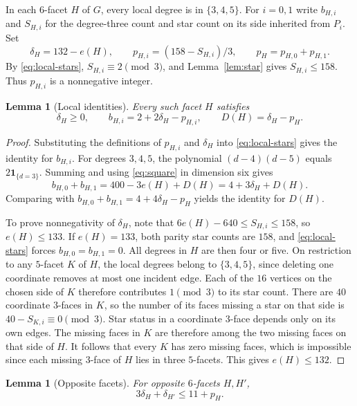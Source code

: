\documentclass[11pt,reqno]{amsart}
\numberwithin{equation}{section}
\newtheorem{lemma}[theorem]{Lemma}
\newcommand{\one}{\mathbf{1}}
\begin{document}
In each \(6\)-facet \(H\) of \(G\), every local degree is in
\(\{3,4,5\}\). For \(i=0,1\) write \(b_{H,i}\) and \(S_{H,i}\)
for the degree-three count and star count on its side inherited from
\(P_i\). Set
\[
  \delta_H=132-e(H),\qquad p_{H,i}=(158-S_{H,i})/3,\qquad
  p_H=p_{H,0}+p_{H,1}.
\]
By \eqref{eq:local-stars}, \(S_{H,i}\equiv2\pmod3\), and
Lemma~\ref{lem:star} gives \(S_{H,i}\le158\). Thus \(p_{H,i}\)
is a nonnegative integer.

\begin{lemma}[Local identities]\label{lem:local-identities}
Every such facet \(H\) satisfies
\begin{equation}\label{eq:local-identities}
  \delta_H\ge0,\qquad
  b_{H,i}=2+2\delta_H-p_{H,i},\qquad D(H)=\delta_H-p_H .
\end{equation}
\end{lemma}

\begin{proof}
Substituting the definitions of \(p_{H,i}\) and \(\delta_H\) into
\eqref{eq:local-stars} gives the identity for \(b_{H,i}\).
For degrees \(3,4,5\), the polynomial \((d-4)(d-5)\) equals
\(2\one_{\{d=3\}}\). Summing and using \eqref{eq:square} in
dimension six gives
\[
  b_{H,0}+b_{H,1}=400-3e(H)+D(H)=4+3\delta_H+D(H).
\]
Comparing with \(b_{H,0}+b_{H,1}=4+4\delta_H-p_H\) yields the
identity for \(D(H)\).

To prove nonnegativity of \(\delta_H\), note that
\(6e(H)-640\le S_{H,i}\le158\), so \(e(H)\le133\).
If \(e(H)=133\), both parity star counts are \(158\), and
\eqref{eq:local-stars} forces \(b_{H,0}=b_{H,1}=0\).
All degrees in \(H\) are then four or five. On restriction to any
\(5\)-facet \(K\) of \(H\), the local degrees belong to \(\{3,4,5\}\),
since deleting one coordinate removes at most one incident edge.
Each of the \(16\) vertices on the chosen side of \(K\) therefore
contributes \(1\pmod3\) to its star count. There are \(40\)
coordinate \(3\)-faces in \(K\), so the number of its faces missing
a star on that side is \(40-S_{K,i}\equiv0\pmod3\).
Star status in a coordinate \(3\)-face depends only on its own edges.
The missing faces in \(K\) are therefore among the two missing faces
on that side of \(H\). It follows that every \(K\) has zero missing
faces, which is impossible since each missing \(3\)-face of \(H\)
lies in three \(5\)-facets. This gives \(e(H)\le132\).
\end{proof}

\begin{lemma}[Opposite facets]\label{lem:opposite}
For opposite \(6\)-facets \(H,H'\),
\begin{equation}\label{eq:opposite}
  3\delta_H+\delta_{H'}\le11+p_H .
\end{equation}
\end{lemma}
\end{document}
